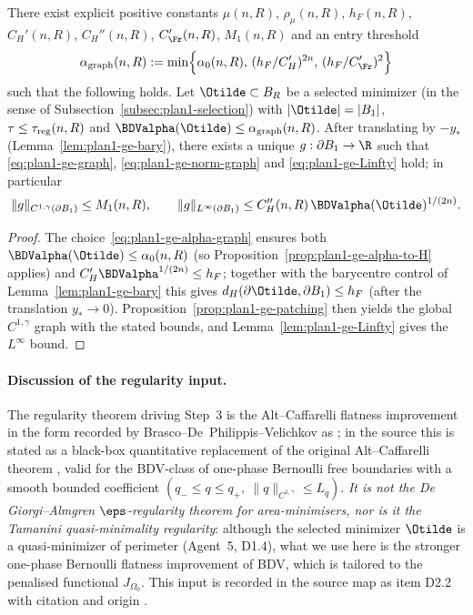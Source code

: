 \begin{theorem}
\label{thm:plan1-ge-graphentry}
There exist explicit positive constants \(\mu(n,R)\), \(\rho_\mu(n,R)\),
\(h_F(n,R)\), \(C_H'(n,R)\), \(C_H''(n,R)\), \(C_{\Fr}'(n,R)\),
\(M_1(n,R)\) and an entry threshold
\begin{equation}\label{eq:plan1-ge-alpha-graph}
   \alpha_{\rm graph}(n,R)
   :=\min\Bigl\{
       \alpha_0(n,R),\,
       (h_F/C_H')^{2n},\,
       (h_F/C_{\Fr}')^2
   \Bigr\}
\end{equation}
such that the following holds. Let \(\Otilde\subset B_R\) be a selected
minimizer (in the sense of Subsection~\ref{subsec:plan1-selection}) with
\(|\Otilde|=|B_1|\), \(\tau\le\tau_{\rm reg}(n,R)\) and
\(\BDValpha(\Otilde)\le\alpha_{\rm graph}(n,R)\). After translating by
\(-y_*\) (Lemma~\ref{lem:plan1-ge-bary}), there exists a unique
\(g:\partial B_1\to\R\) such that
\eqref{eq:plan1-ge-graph}, \eqref{eq:plan1-ge-norm-graph} and
\eqref{eq:plan1-ge-Linfty} hold; in particular
\[
   \|g\|_{C^{1,\gamma}(\partial B_1)}\le M_1(n,R),\qquad
   \|g\|_{L^\infty(\partial B_1)}
   \le C_H''(n,R)\,\BDValpha(\Otilde)^{1/(2n)}.
\]
\end{theorem}

\begin{proof}
The choice~\eqref{eq:plan1-ge-alpha-graph} ensures both
\(\BDValpha(\Otilde)\le\alpha_0(n,R)\) (so
Proposition~\ref{prop:plan1-ge-alpha-to-H} applies) and
\(C_H'\BDValpha^{1/(2n)}\le h_F\); together with the barycentre control
of Lemma~\ref{lem:plan1-ge-bary} this gives
\(d_H(\partial\Otilde,\partial B_1)\le h_F\) (after the translation
\(y_*\to 0\)). Proposition~\ref{prop:plan1-ge-patching} then yields
the global \(C^{1,\gamma}\) graph with the stated bounds, and
Lemma~\ref{lem:plan1-ge-Linfty} gives the \(L^\infty\) bound.
\end{proof}

\paragraph{Discussion of the regularity input.}
The regularity theorem driving Step~3 is the Alt--Caffarelli flatness
improvement in the form recorded by Brasco--De~Philippis--Velichkov as
\cite[Theorem~4.18]{BDV}; in the source this is stated as a black-box
quantitative replacement of the original Alt--Caffarelli theorem
\cite{AC1981}, valid for the BDV-class of one-phase Bernoulli
free boundaries with a smooth bounded coefficient
\((q_-\le q\le q_+,\ \|q\|_{C^{1,\gamma}}\le L_q)\). \emph{It is not the
De Giorgi--Almgren \(\eps\)-regularity theorem for area-minimisers, nor is
it the Tamanini quasi-minimality regularity}: although the selected
minimizer \(\Otilde\) is a quasi-minimizer of perimeter (Agent~5,
D1.4), what we use here is the stronger one-phase Bernoulli flatness
improvement of BDV, which is tailored to the penalised functional
\(J_{\Omega_0}\). This input is recorded in the source map as item
D2.2 with citation \cite[Theorem~4.18]{BDV} and origin
\cite{AC1981}.

